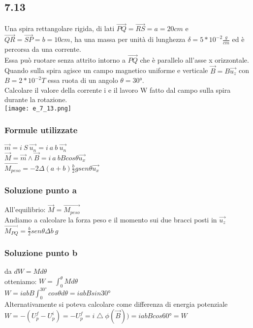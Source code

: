 \documentclass[../../main.tex]{subfiles}
\begin{document}
\subsection*{7.13}
Una spira rettangolare rigida, di lati $\vec{PQ} = \vec{RS} = a = 20cm$ e $\vec{QR} = \vec{SP} = b = 10cm$, ha una massa per unità di lunghezza $\delta = 5 * 10^{-2} \frac{g}{cm}$ ed è percorsa da una corrente.
\\Essa può ruotare senza attrito intorno a $\vec{PQ}$ che è parallelo all'asse x orizzontale. Quando sulla spira agisce un campo magnetico uniforme e verticale $\vec{B}=B\vec{u_z}$ con $B=2*10^{-2}T$ essa ruota di un angolo $\theta = 30°$.
\\Calcolare il valore della corrente i e il lavoro W fatto dal campo sulla spira durante la rotazione. 
\\\texttt{[image: e\_7\_13.png]}
\subsubsection*{Formule utilizzate}
$\vec{m} = i\ S\ \vec{u_n} = i\ a\ b\ \vec{u_n}$
\\$\vec{M} = \vec{m} \wedge  \vec{B} = i\ a\ bB cos\theta\vec{u_x}$
\\$\vec{M_{peso}} = -2\Delta(a+b)\frac{b}{2}gsen\theta\vec{u_x}$
\subsubsection*{Soluzione punto a}
All'equilibrio: $\vec{M} = \vec{M_{peso}}$
\\Andiamo a calcolare la forza peso e il momento sui due bracci posti in $\vec{u_z}$
\\$\vec{M_{PQ}} = \frac{b}{2}sen\theta\Delta b\ g$
\subsubsection*{Soluzione punto b}
da $dW = Md\theta$
\\otteniamo: $W = \int_0^\theta Md\theta$
\\$W = iabB\int_0^{30°}cos\theta d\theta = iabBsin30°$
\\Alternativamente si poteva calcolare come differenza di energia potenziale
\\$W = -(U_p^f - U_p^i) = -U_p^f = i\bigtriangleup \phi(\vec{B})) =iabBcos60° = W$
\newpage
\end{document}
